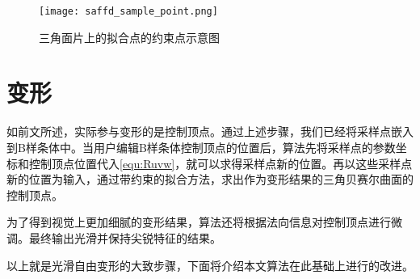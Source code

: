 \begin{figure}[htbp]
	\centering
	\texttt{[image: saffd\_sample\_point.png]}
	\caption{三角面片上的拟合点的约束点示意图}\label{fig:saffd_sample_point}
\end{figure}


\section{变形}
如前文所述，实际参与变形的是控制顶点。通过上述步骤，我们已经将采样点嵌入到B样条体中。当用户编辑B样条体控制顶点的位置后，算法先将采样点的参数坐标和控制顶点位置代入\autoref{equ:Ruvw}，就可以求得采样点新的位置。再以这些采样点新的位置为输入，通过带约束的拟合方法，求出作为变形结果的三角贝赛尔曲面的控制顶点。

为了得到视觉上更加细腻的变形结果，算法还将根据法向信息对控制顶点进行微调。最终输出光滑并保持尖锐特征的结果。

以上就是光滑自由变形的大致步骤，下面将介绍本文算法在此基础上进行的改进。

